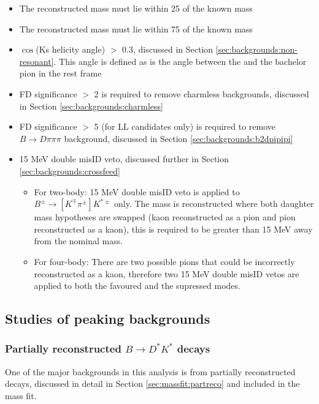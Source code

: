 \begin{itemize}
\item The reconstructed \Dz mass must lie within 25 \mev of the known \Dz mass
\item The reconstructed \Kstarm mass must lie within 75 \mev of the known \Kstarp mass
\item{\textbar $\cos$(Ks helicity angle) \textbar $>$ 0.3, discussed in Section \ref{sec:backgrounds:non-resonant}. This angle is defined as is the angle between the \KS and the bachelor pion in the \Kstarm rest frame}
\item{\Dz FD significance $>$ 2 is required to remove charmless backgrounds, discussed in Section \ref{sec:backgrounds:charmless}}
\item{\KS FD significance $>$ 5 (for LL candidates only) is required to remove $B \to D\pi\pi\pi$ background, discussed in Section \ref{sec:backgrounds:b2dpipipi}}
\item{15 MeV double misID veto, discussed further in Section \ref{sec:backgrounds:crossfeed}}
\begin{itemize}
\item For two-body: 15 MeV double misID veto is applied to $B^{\pm} \to [K^{\mp}\pi^{\pm}] K^{*\pm}$ only. The \Dz mass is reconstructed where both daughter mass hypotheses are swapped (kaon reconstructed as a pion and pion reconstructed as a kaon), this is required to be greater than 15 MeV away from the nominal \Dz mass.
\item For four-body: There are two possible pions that could be incorrectly reconstructed as a kaon, therefore two 15 MeV double misID vetos are applied to both the favoured and the supressed modes. 
\end{itemize} 
\end{itemize}

\subsection{Studies of peaking backgrounds}
\label{sec:backgrounds}

\subsubsection{Partially reconstructed $B \to D^*K^*$ decays}
\label{sec:backgrounds:partreco}

One of the major backgrounds in this analysis is from partially reconstructed \decay{\B}{\Dstar\Kstar} decays, discussed in detail in Section \ref{sec:massfit:partreco} and included in the mass fit.

